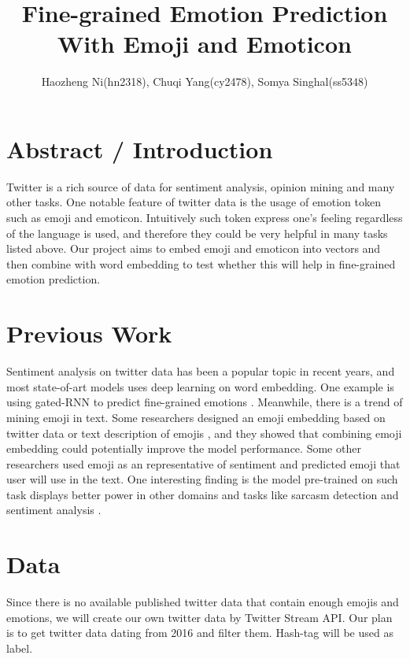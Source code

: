 \documentclass{proc}
\begin{document}
\title{Fine-grained Emotion Prediction With Emoji and Emoticon}

\author{Haozheng Ni(hn2318), Chuqi Yang(cy2478), Somya Singhal(ss5348)}

\maketitle

\section{Abstract / Introduction}


Twitter is a rich source of data for sentiment analysis, opinion mining and many other tasks. One notable feature of twitter data is the usage of emotion token such as emoji and emoticon. Intuitively such token express one's feeling regardless of the language is used, and therefore they could be very helpful in many tasks listed above. Our project aims to embed emoji and emoticon into vectors and then combine with word embedding to test whether this will help in fine-grained emotion prediction.


\section{Previous Work}

Sentiment analysis on twitter data has been a popular topic in recent years, and most state-of-art models uses deep learning on word embedding. One example is using gated-RNN to predict fine-grained emotions \cite{abdul2017emonet}. Meanwhile, there is a trend of mining emoji in text. Some researchers designed an emoji embedding based on twitter data \cite{barbieri2016does} or text description of emojis \cite{eisner2016emoji2vec}, and they showed that combining emoji embedding could potentially improve the model performance. Some other researchers used emoji as an representative of sentiment and predicted emoji that user will use in the text. One interesting finding is the model pre-trained on such task displays better power in other domains and tasks like sarcasm detection and sentiment analysis \cite{felbo2017using}. 

\section{Data}
Since there is no available published twitter data that contain enough emojis and emotions, we will create our own twitter data by Twitter Stream API. Our plan is to get twitter data dating from 2016 and filter them. Hash-tag will be used as label.
\end{document}
